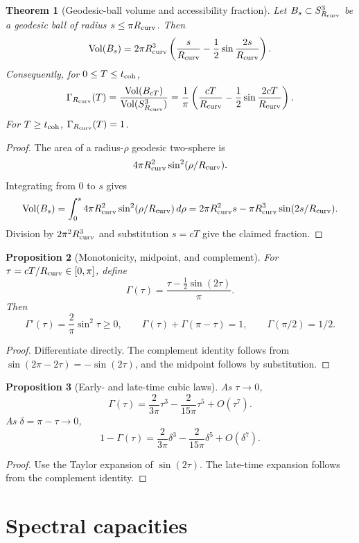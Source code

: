 \documentclass[11pt,a4paper]{article}
\newtheorem{theorem}{Theorem}[section]
\newtheorem{proposition}[theorem]{Proposition}
\newcommand{\Vol}{\operatorname{Vol}}
\begin{document}
\begin{theorem}[Geodesic-ball volume and accessibility fraction]
Let $B_s\subset S^3_{R_{\rm curv}}$ be a geodesic ball of radius $s\le\pi R_{\rm curv}$.  Then
\[
\Vol(B_s)
=
2\pi R_{\rm curv}^3
\left(
\frac{s}{R_{\rm curv}}
-\frac12\sin\frac{2s}{R_{\rm curv}}
\right).
\]
Consequently, for $0\le T\le t_{\rm coh}$,
\[
\Gamma_{R_{\rm curv}}(T)
=
\frac{\Vol(B_{cT})}{\Vol(S^3_{R_{\rm curv}})}
=
\frac{1}{\pi}
\left(
\frac{cT}{R_{\rm curv}}
-\frac12\sin\frac{2cT}{R_{\rm curv}}
\right).
\]
For $T\ge t_{\rm coh}$, $\Gamma_{R_{\rm curv}}(T)=1$.
\end{theorem}
\begin{proof}
The area of a radius-$\rho$ geodesic two-sphere is
\[
4\pi R_{\rm curv}^2\sin^2(\rho/R_{\rm curv}).
\]
Integrating from $0$ to $s$ gives
\[
\Vol(B_s)=\int_0^s4\pi R_{\rm curv}^2\sin^2(\rho/R_{\rm curv})\,d\rho
=
2\pi R_{\rm curv}^2s-\pi R_{\rm curv}^3\sin(2s/R_{\rm curv}).
\]
Division by $2\pi^2R_{\rm curv}^3$ and substitution $s=cT$ give the claimed fraction.
\end{proof}

\begin{proposition}[Monotonicity, midpoint, and complement]
For $\tau=cT/R_{\rm curv}\in[0,\pi]$, define
\[
\Gamma(\tau)=\frac{\tau-\frac12\sin(2\tau)}{\pi}.
\]
Then
\[
\Gamma'(\tau)=\frac{2}{\pi}\sin^2\tau\ge0,
\qquad
\Gamma(\tau)+\Gamma(\pi-\tau)=1,
\qquad
\Gamma(\pi/2)=1/2.
\]
\end{proposition}
\begin{proof}
Differentiate directly.  The complement identity follows from $\sin(2\pi-2\tau)=-\sin(2\tau)$, and the midpoint follows by substitution.
\end{proof}

\begin{proposition}[Early- and late-time cubic laws]
As $\tau\to0$,
\[
\Gamma(\tau)=\frac{2}{3\pi}\tau^3-\frac{2}{15\pi}\tau^5+O(\tau^7).
\]
As $\delta=\pi-\tau\to0$,
\[
1-\Gamma(\tau)=\frac{2}{3\pi}\delta^3-\frac{2}{15\pi}\delta^5+O(\delta^7).
\]
\end{proposition}
\begin{proof}
Use the Taylor expansion of $\sin(2\tau)$.  The late-time expansion follows from the complement identity.
\end{proof}

\section{Spectral capacities}
\label{sec:spectral-capacities}
\end{document}
